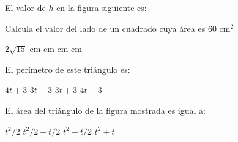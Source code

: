 \documentclass[10pt,letterpaper,addpoints]{exam}
\begin{document}
\begin{multicols}{2}
\begin{questions}
\question El valor de $h$ en la figura siguiente es:
\begin{center}
\end{center}
\begin{oneparchoices}
\end{oneparchoices}
\question Calcula el valor del lado de un cuadrado cuya \'area es 60 cm$^{2}$

\begin{oneparchoices}
\CorrectChoice $2\sqrt{15}$ cm
 cm
 cm
 cm
\end{oneparchoices}

\begin{center}
\end{center}
\question \label{quest:10} El perímetro de este triángulo es:

\begin{choices}
\choice $4t+3$
\choice $3t-3$
\CorrectChoice $3t+3$
\choice $4t-3$
\end{choices}
\question \label{quest:11}
El \'area del tri\'angulo de la figura mostrada es igual a:
\begin{choices}
\choice $t^{2}/2$
\CorrectChoice $t^{2}/2+t/2$
\choice $t^{2}+t/2$
\choice $t^{2}+t$
\end{choices}
\end{questions}
\end{multicols}
\end{document}
